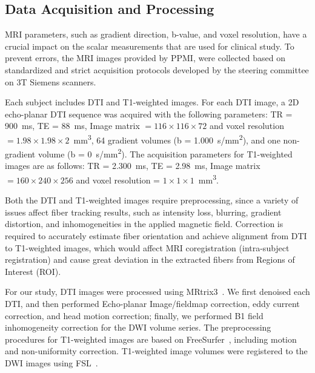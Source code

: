 \subsection{Data Acquisition and Processing}
\label{sec:dataProcessing}

\noindent MRI parameters, such as gradient direction, b-value, and voxel resolution, have a crucial impact on the scalar measurements that are used for clinical study. To prevent errors, the MRI images provided by PPMI, were collected based on standardized and strict acquisition protocols developed by the steering committee on 3T Siemens scanners.

Each subject includes DTI and T1-weighted images. For each DTI image, a 2D echo-planar DTI sequence was acquired with the following parameters: TR = \SI{900}{ms}, TE = \SI{88}{ms}, Image matrix $= 116\times116\times72$ and voxel resolution $ = 1.98\times1.98\times2$\SI{}{mm^3}, 64 gradient volumes (b = \SI{1,000}{s/mm^2}), and one non-gradient volume (b = \SI{0}{s/mm^2}). The acquisition parameters for T1-weighted images are as follows: TR = \SI{2,300}{ms}, TE = \SI{2.98}{ms}, Image matrix $= 160\times240\times256$ and voxel resolution = $ 1\times1\times1$\SI{}{mm^3}.

Both the DTI and T1-weighted images require preprocessing, since a variety of issues affect fiber tracking results, such as intensity loss, blurring, gradient distortion, and inhomogeneities in the applied magnetic field. Correction is required to accurately estimate fiber orientation and achieve alignment from DTI to T1-weighted images, which would affect MRI coregistration (intra-subject registration) and cause great deviation in the extracted fibers from Regions of Interest (ROI).


For our study, DTI images were processed using MRtrix3~\cite{mrtrix3}. We first denoised each DTI, and then performed Echo-planar Image/fieldmap correction, eddy current correction, and head motion correction; finally, we performed B1 field inhomogeneity correction for the DWI volume series. The preprocessing procedures for T1-weighted images are based on FreeSurfer~\cite{freesurfer}, including motion and non-uniformity correction. T1-weighted image volumes were registered to the DWI images using FSL~\cite{fsl}. %

